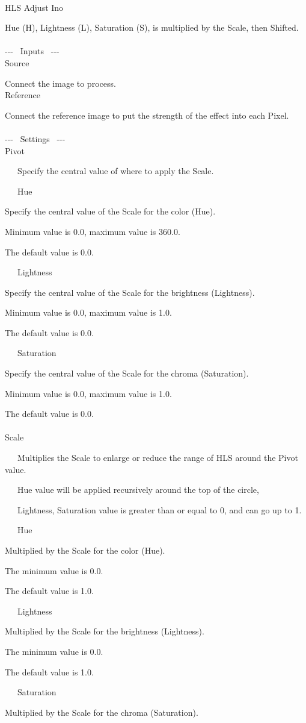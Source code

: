 \documentclass[a4paper,12pt]{article}
\begin{document}
\thispagestyle{empty}

\Large
\noindent \\
HLS Adjust Ino\medskip
\par
\normalsize
Hue (H), Lightness (L), Saturation (S), is multiplied by the Scale, then Shifted.\\
\\
-{-}- \ Inputs \ -{-}-\\
Source\par
Connect the image to process.\\
Reference\par
Connect the reference image to put the strength of the effect into each Pixel.\\
\\
-{-}- \ Settings \ -{-}-\\
Pivot\par
\noindent \ \ \, Specify the central value of where to apply the Scale.\\
\par
\noindent \ \ \, Hue\par
Specify the central value of the Scale for the color (Hue).\par
Minimum value is 0.0, maximum value is 360.0.\par
The default value is 0.0.\par
\noindent \ \ \, Lightness\par
Specify the central value of the Scale for the brightness (Lightness).\par
Minimum value is 0.0, maximum value is 1.0.\par
The default value is 0.0.\par
\noindent \ \ \, Saturation\par
Specify the central value of the Scale for the chroma (Saturation).\par
Minimum value is 0.0, maximum value is 1.0.\par
The default value is 0.0.\\
\\
Scale\par
\noindent \ \ \, Multiplies the Scale to enlarge or reduce the range of HLS around the Pivot value.\par
\noindent \ \ \, Hue value will be applied recursively around the top of the circle,\par
\noindent \ \ \, Lightness, Saturation value is greater than or equal to 0, and can go up to 1.\\
\par
\noindent \ \ \, Hue\par
Multiplied by the Scale for the color (Hue).\par
The minimum value is 0.0.\par
The default value is 1.0.\par
\noindent \ \ \, Lightness\par
Multiplied by the Scale for the brightness (Lightness).\par
The minimum value is 0.0.\par
The default value is 1.0.\par
\noindent \ \ \, Saturation\par
Multiplied by the Scale for the chroma (Saturation).
\end{document}
